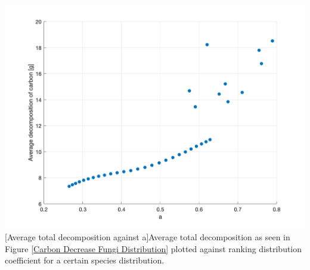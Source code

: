 \documentclass[12pt]{article}
\begin{document}
\begin{center}\label{Competitive Distribution Coefficients}
\includegraphics[width=\linewidth]{a-competative-distribution-coef_to_avg_Clost.png}
[Average total decomposition against a]{Average total decomposition as seen in Figure \ref{Carbon Decrease Fungi Distribution} plotted against ranking distribution coefficient for a certain species distribution.}
\end{center}
\end{document}
